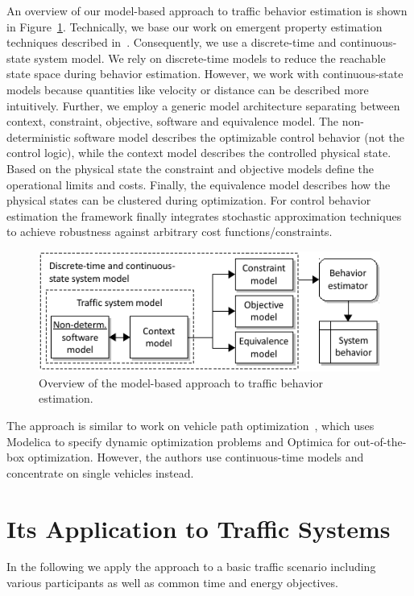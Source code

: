 \documentclass[conference]{../cls/IEEEtran}
\begin{document}
An overview of our model-based approach to traffic behavior estimation is shown in Figure~\ref{fig:framework}. Technically, we base our work on emergent property estimation techniques described in~\cite{Hackenberg2012}. Consequently, we use a discrete-time and continuous-state system model. We rely on discrete-time models to reduce the reachable state space during behavior estimation. However, we work with continuous-state models because quantities like velocity or distance can be described more intuitively. Further, we employ a generic model architecture separating between context, constraint, objective, software and equivalence model. The non-deterministic software model describes the optimizable control behavior (not the control logic), while the context model describes the controlled physical state. Based on the physical state the constraint and objective models define the operational limits and costs. Finally, the equivalence model describes how the physical states can be clustered during optimization. For control behavior estimation the framework finally integrates stochastic approximation techniques~\cite{Pereira1991} to achieve robustness against arbitrary cost functions/constraints.

\begin{figure}[h]
	\centering
	\includegraphics{../gfx/framework.pdf}
	\caption{Overview of the model-based approach to traffic behavior estimation.}
	\label{fig:framework}
\end{figure}

The approach is similar to work on vehicle path optimization~\cite{Danielsson2007}, which uses Modelica to specify dynamic optimization problems and Optimica for out-of-the-box optimization. However, the authors use continuous-time models and concentrate on single vehicles instead.

\section{Its Application to Traffic Systems}

In the following we apply the approach to a basic traffic scenario including various participants as well as common time and energy objectives.
\end{document}
